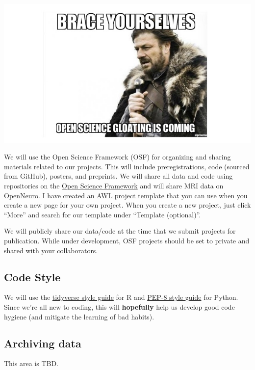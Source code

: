 \documentclass[
]{book}
\begin{document}
\includegraphics{images/open_science.jpg}

We will use the Open Science Framework (OSF) for organizing and sharing materials related to our projects. This will include preregistrations, code (sourced from GitHub), posters, and preprints. We will share all data and code using repositories on the \href{https://osf.io/}{Open Science Framework} and will share MRI data on \href{https://openneuro.org/}{OpenNeuro}. I have created an \href{https://osf.io/ce8p4/}{AWL project template} that you can use when you create a new page for your own project. When you create a new project, just click ``More'' and search for our template under ``Template (optional)''.

We will publicly share our data/code at the time that we submit projects for publication. While under development, OSF projects should be set to private and shared with your collaborators.

\hypertarget{code-style}{%
\subsection{Code Style}\label{code-style}}

We will use the \href{https://style.tidyverse.org/}{tidyverse style guide} for R and \href{https://www.python.org/dev/peps/pep-0008/}{PEP-8 style guide} for Python. Since we're all new to coding, this will \textbf{hopefully} help us develop good code hygiene (and mitigate the learning of bad habits).

\hypertarget{archiving-data}{%
\subsection{Archiving data}\label{archiving-data}}

This area is TBD.
\end{document}
